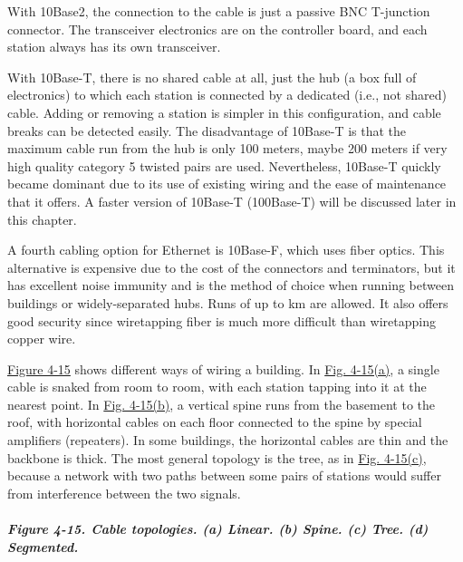\documentclass[b5paper,11pt]{memoir}
\begin{document}
With 10Base2, the connection to the cable is just a passive BNC
T-junction connector. The transceiver electronics are on the controller
board, and each station always has its own transceiver.

With 10Base-T, there is no shared cable at all, just the hub (a box full
of electronics) to which each station is connected by a dedicated (i.e.,
not shared) cable. Adding or removing a station is simpler in this
configuration, and cable breaks can be detected easily. The disadvantage
of 10Base-T is that the maximum cable run from the hub is only 100
meters, maybe 200 meters if very high quality category 5 twisted pairs
are used. Nevertheless, 10Base-T quickly became dominant due to its use
of existing wiring and the ease of maintenance that it offers. A faster
version of 10Base-T (100Base-T) will be discussed later in this chapter.

A fourth cabling option for Ethernet is {10Base-F}, which uses fiber
optics. This alternative is expensive due to the cost of the connectors
and terminators, but it has excellent noise immunity and is the method
of choice when running between buildings or widely-separated hubs. Runs
of up to km are allowed. It also offers good security since wiretapping
fiber is much more difficult than wiretapping copper wire.

\protect\hyperlink{0130661023_ch04lev1sec3.htmlux5cux23ch04fig15}{Figure
4-15} shows different ways of wiring a building. In
\protect\hyperlink{0130661023_ch04lev1sec3.htmlux5cux23ch04fig15}{Fig.
4-15(a)}, a single cable is snaked from room to room, with each station
tapping into it at the nearest point. In
\protect\hyperlink{0130661023_ch04lev1sec3.htmlux5cux23ch04fig15}{Fig.
4-15(b)}, a vertical spine runs from the basement to the roof, with
horizontal cables on each floor connected to the spine by special
amplifiers (repeaters). In some buildings, the horizontal cables are
thin and the backbone is thick. The most general topology is the tree,
as in
\protect\hyperlink{0130661023_ch04lev1sec3.htmlux5cux23ch04fig15}{Fig.
4-15(c)}, because a network with two paths between some pairs of
stations would suffer from interference between the two signals.

\subparagraph[Figure 4-15. Cable topologies. (a) Linear. (b) Spine. (c)
Tree. (d)
Segmented.]{\texorpdfstring{\protect\hypertarget{0130661023_ch04lev1sec3.htmlux5cux23ch04fig15}{}{}Figure
4-15. Cable topologies. (a) Linear. (b) Spine. (c) Tree. (d)
Segmented.}{Figure 4-15. Cable topologies. (a) Linear. (b) Spine. (c) Tree. (d) Segmented.}}
\end{document}
